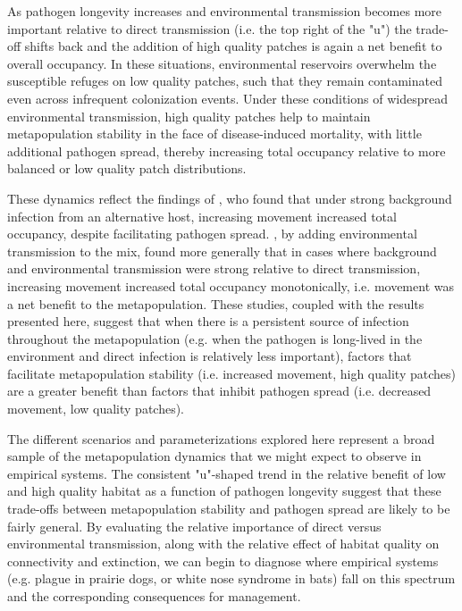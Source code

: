 \documentclass{svjour3}
\begin{document}
As pathogen longevity increases and environmental transmission becomes more important relative to direct transmission (i.e. the top right of the "u") the trade-off shifts back and the addition of high quality patches is again a net benefit to overall occupancy.  In these situations, environmental reservoirs overwhelm the susceptible refuges on low quality patches, such that they remain contaminated even across infrequent colonization events.  Under these conditions of widespread environmental transmission, high quality patches help to maintain metapopulation stability in the face of disease-induced mortality, with little additional pathogen spread, thereby increasing total occupancy relative to more balanced or low quality patch distributions.  

These dynamics reflect the findings of \cite{Gog2002}, who found that under strong background infection from an alternative host, increasing movement increased total occupancy, despite facilitating pathogen spread.  \cite{Park2012}, by adding environmental transmission to the mix, found more generally that in cases where background and environmental transmission were strong relative to direct transmission, increasing movement increased total occupancy monotonically, i.e. movement was a net benefit to the metapopulation.  These studies, coupled with the results presented here, suggest that when there is a persistent source of infection throughout the metapopulation (e.g. when the pathogen is long-lived in the environment and direct infection is relatively less important), factors that facilitate metapopulation stability (i.e. increased movement, high quality patches) are a greater benefit than factors that inhibit pathogen spread (i.e. decreased movement, low quality patches).   

The different scenarios and parameterizations explored here represent a broad sample of the metapopulation dynamics that we might expect to observe in empirical systems.  The consistent "u"-shaped trend in the relative benefit of low and high quality habitat as a function of pathogen longevity suggest that these trade-offs between metapopulation stability and pathogen spread are likely to be fairly general.  By evaluating the relative importance of direct versus environmental transmission, along with the relative effect of habitat quality on connectivity and extinction, we can begin to diagnose where empirical systems (e.g. plague in prairie dogs, or white nose syndrome in bats) fall on this spectrum and the corresponding consequences for management.
\end{document}
